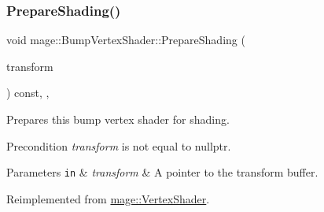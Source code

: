 \subsubsection{\texorpdfstring{Prepare\+Shading()}{PrepareShading()}}
{\footnotesize\ttfamily void mage\+::\+Bump\+Vertex\+Shader\+::\+Prepare\+Shading (\begin{DoxyParamCaption}\item[{I\+D3\+D11\+Buffer $\ast$}]{transform }\end{DoxyParamCaption}) const\hspace{0.3cm}{\ttfamily [final]}, {\ttfamily [override]}, {\ttfamily [virtual]}}

Prepares this bump vertex shader for shading.

\begin{DoxyPrecond}{Precondition}
{\itshape transform} is not equal to {\ttfamily nullptr}. 
\end{DoxyPrecond}

\begin{DoxyParams}[1]{Parameters}
\mbox{\tt in}  & {\em transform} & A pointer to the transform buffer. \\
\hline
\end{DoxyParams}


Reimplemented from \hyperlink{classmage_1_1_vertex_shader_a53f4b25241f6c5739724d421c9f29a36}{mage\+::\+Vertex\+Shader}.

